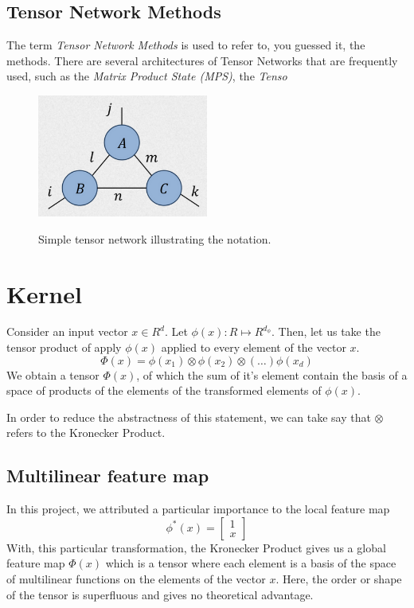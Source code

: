 \documentclass[11pt]{article}
\theoremstyle{definition}
\theoremstyle{definition}
\begin{document}
\subsection{Tensor Network Methods}
The term {\it Tensor Network Methods} is used to refer to, you guessed it, the methods.
There are several architectures of Tensor Networks that are frequently used, such 
as the {\it Matrix Product State (MPS)}, the {\it Tenso}

\begin{figure}[h]
\centering
\caption{Simple tensor network illustrating the notation.}
\includegraphics[width=0.5\textwidth]{images/2023-03-21-10-22-39.png}
\label{fig:tensor_net}
\end{figure}

\section{Kernel}

Consider an input vector $x \in R^d$. Let $\phi(x) : R \mapsto R^{d_{\phi}}$.  
Then, let us take the tensor product of apply $\phi(x)$ applied 
to every element of the vector $x$.
\begin{equation}
    \Phi(x) = \phi(x_1) \otimes  \phi(x_2) 
                \otimes (\dots) \phi(x_d)
\end{equation}
We obtain a tensor $\Phi(x)$, of which the sum of it's element 
contain the basis of a space of products of the elements of the transformed
elements of $\phi(x)$.

In order to reduce the abstractness of this statement, we can take say
that $\otimes$ refers to the Kronecker Product.

\subsection{Multilinear feature map}
In this project, we attributed a particular importance to the local feature map
\begin{equation}
    \phi^*(x) = 
    \begin{bmatrix}
        1 \\
        x
    \end{bmatrix}
\end{equation}
With, this particular transformation, the Kronecker Product gives us a global feature map
$\Phi(x)$ which is a tensor where each element is a basis of the 
space of multilinear functions on the elements of the vector $x$. Here, the 
order or shape of the tensor is superfluous and gives no theoretical advantage.
\end{document}

